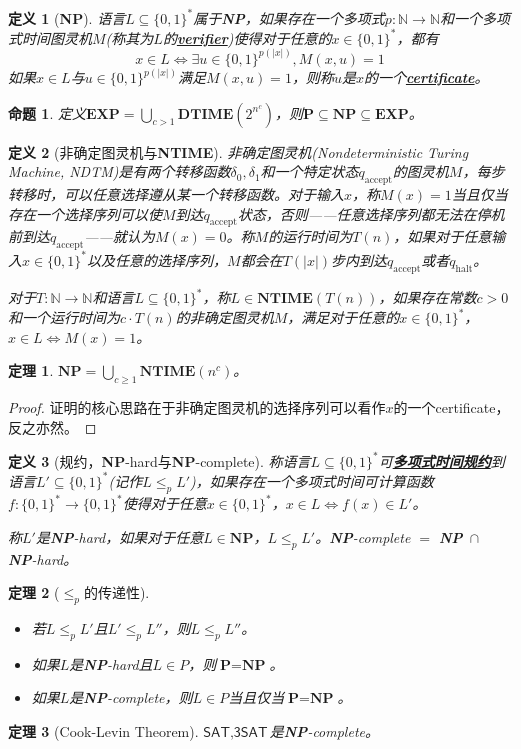 \documentclass[8pt]{article}
\theoremstyle{compact}
\newtheorem{theorem}{定理}
\newtheorem{definition}{定义}
\newtheorem{proposition}{命题}
\def\obj#1{\textbf{\uline{#1}}}
\def\le{\leqslant}
\def\ge{\geqslant}
\def\DTIME{\textbf{DTIME}}
\def\NTIME{\textbf{NTIME}}
\def\P{\textbf{P}}
\def\NP{\textbf{NP}}
\def\EXP{\textbf{EXP}}
\begin{document}
\begin{definition}[\NP]
	语言$L \subseteq \{0, 1\}^*$属于\NP，如果存在一个多项式$p: \mathbb N \to \mathbb N$和一个多项式时间图灵机$M$(称其为$L$的\obj{verifier})使得对于任意的$x \in \{0, 1\}^*$，都有
	$$x \in L \Leftrightarrow \exists u \in \{0, 1\}^{p(|x|)}, M(x, u) = 1$$
	如果$x \in L$与$u \in \{0, 1\}^{p(|x|)}$满足$M(x, u) = 1$，则称$u$是$x$的一个\obj{certificate}。
\end{definition}
\begin{proposition}
	定义$\EXP = \bigcup_{c > 1} \DTIME(2^{n^c})$，则$\P \subseteq \NP \subseteq \EXP$。
\end{proposition}
\begin{definition}[非确定图灵机与\NTIME]
	非确定图灵机(Nondeterministic Turing Machine, NDTM)是有两个转移函数$\delta_0, \delta_1$和一个特定状态$q_{\text{accept}}$的图灵机$M$，每步转移时，可以任意选择遵从某一个转移函数。对于输入$x$，称$M(x) = 1$当且仅当存在一个选择序列可以使$M$到达$q_{\text{accept}}$状态，否则——任意选择序列都无法在停机前到达$q_{\text{accept}}$——就认为$M(x) = 0$。称$M$的运行时间为$T(n)$，如果对于任意输入$x \in \{0, 1\}^*$以及任意的选择序列，$M$都会在$T(|x|)$步内到达$q_{\text{accept}}$或者$q_{\text{halt}}$。

	对于$T: \mathbb N \to \mathbb N$和语言$L \subseteq \{0, 1\}^*$，称$L \in \NTIME(T(n))$，如果存在常数$c > 0$和一个运行时间为$c \cdot T(n)$的非确定图灵机$M$，满足对于任意的$x \in \{0, 1\}^*$，$x \in L \Leftrightarrow M(x) = 1$。
\end{definition}
\begin{theorem}
	$\NP = \bigcup_{c \ge 1} \NTIME(n^c)$。
\end{theorem}
\begin{proof}
	证明的核心思路在于非确定图灵机的选择序列可以看作$x$的一个certificate，反之亦然。
\end{proof}

\begin{definition}[规约，\NP-hard与\NP-complete]
	称语言$L \subseteq \{0, 1\}^*$可\obj{多项式时间规约}到语言$L' \subseteq \{0, 1\}^*$(记作$L \le_p L'$)，如果存在一个多项式时间可计算函数$f: \{0, 1\}^* \to \{0, 1\}^*$使得对于任意$x \in \{0, 1\}^*$，$x \in L \Leftrightarrow f(x) \in L'$。

	称$L'$是\NP-hard，如果对于任意$L \in \NP$，$L \le_p L'$。\NP-complete $=$ \NP\ $\cap$ \NP-hard。 
\end{definition}
\begin{theorem}[$\le_p$的传递性]
	\begin{itemize}
		\item 若$L \le_p L'$且$L' \le_p L''$，则$L \le_p L''$。
		\item 如果$L$是\NP-hard且$L \in P$，则$\P = \NP$。
		\item 如果$L$是\NP-complete，则$L \in P$当且仅当$\P = \NP$。
	\end{itemize}
\end{theorem}
\begin{theorem}[Cook-Levin Theorem]
	$\textsf{SAT}, \textsf{3SAT}$是\NP-complete。
\end{theorem}
\end{document}
